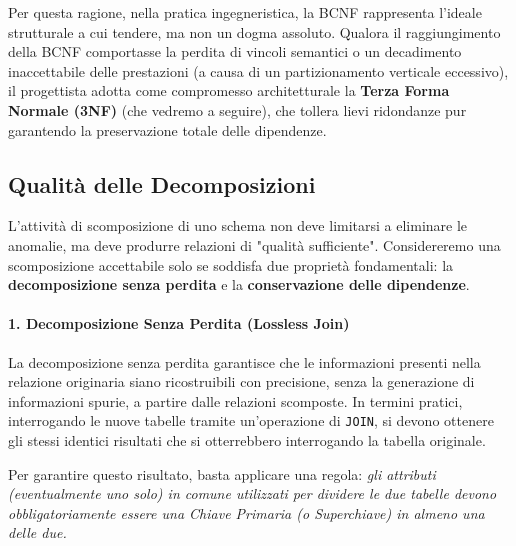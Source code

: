 Per questa ragione, nella pratica ingegneristica, la BCNF rappresenta l'ideale strutturale a cui tendere, ma non un dogma assoluto. Qualora il raggiungimento della BCNF comportasse la perdita di vincoli semantici o un decadimento inaccettabile delle prestazioni (a causa di un partizionamento verticale eccessivo), il progettista adotta come compromesso architetturale la \textbf{Terza Forma Normale (3NF)} (che vedremo a seguire), che tollera lievi ridondanze pur garantendo la preservazione totale delle dipendenze.

\subsection{Qualità delle Decomposizioni}

L'attività di scomposizione di uno schema non deve limitarsi a eliminare le anomalie, ma deve produrre relazioni di "qualità sufficiente". Considereremo una scomposizione accettabile solo se soddisfa due proprietà fondamentali: la \textbf{decomposizione senza perdita} e la \textbf{conservazione delle dipendenze}.

\paragraph{1. Decomposizione Senza Perdita (Lossless Join)}
La decomposizione senza perdita garantisce che le informazioni presenti nella relazione originaria siano ricostruibili con precisione, senza la generazione di informazioni spurie, a partire dalle relazioni scomposte. In termini pratici, interrogando le nuove tabelle tramite un'operazione di \texttt{JOIN}, si devono ottenere gli stessi identici risultati che si otterrebbero interrogando la tabella originale.

Per garantire questo risultato, basta applicare una regola: \textit{gli attributi (eventualmente uno solo) in comune utilizzati per dividere le due tabelle devono obbligatoriamente essere una Chiave Primaria (o Superchiave) in almeno una delle due.}

